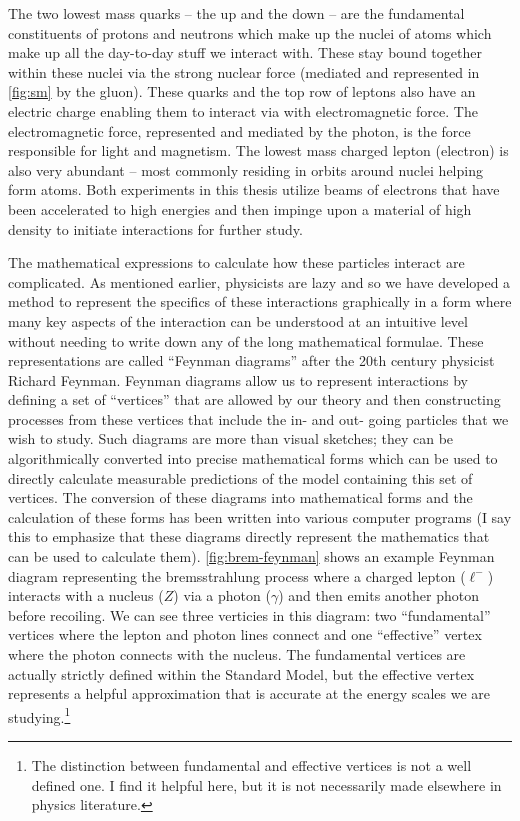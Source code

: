 The two lowest mass quarks -- the up and the down -- are the fundamental constituents of protons
and neutrons which make up the nuclei of atoms which make up all the day-to-day stuff we interact
with. These stay bound together within these nuclei via the strong nuclear force (mediated and
represented in \cref{fig:sm} by the gluon). These quarks and the top row of leptons also have an
electric charge enabling them to interact via with electromagnetic force.
The electromagnetic force, represented and mediated by the photon, is the force
responsible for light and magnetism. The lowest mass charged lepton (electron) is also very
abundant -- most commonly residing in orbits around nuclei helping form atoms. Both experiments in
this thesis utilize beams of electrons that have been accelerated to high energies and then
impinge upon a material of high density to initiate interactions for further study.

The mathematical expressions to calculate how these particles interact are complicated. As
mentioned earlier, physicists are lazy and so we have developed a method to represent the specifics
of these interactions graphically in a form where many key aspects of the interaction can be understood
at an intuitive level without needing to write down any of the long mathematical formulae. These
representations are called ``Feynman diagrams'' after the 20th century physicist Richard Feynman.
Feynman diagrams allow us to represent interactions by defining a set of ``vertices'' that are
allowed by our theory and then constructing processes from these vertices that include the in- and
out- going particles that we wish to study. Such diagrams are more than visual sketches; they can
be algorithmically converted into precise mathematical forms which can be used to directly calculate
measurable predictions of the model containing this set of vertices. The conversion of these diagrams
into mathematical forms and the calculation of these forms has been written into various computer
programs (I say this to emphasize that these diagrams directly represent the mathematics that
can be used to calculate them).
\cref{fig:brem-feynman} shows an example Feynman diagram representing the bremsstrahlung process
where a charged lepton (\(\ell^-\)) interacts with a nucleus (\(Z\)) via a photon (\(\gamma\)) and
then emits another photon before recoiling. We can see three verticies in this diagram: two
``fundamental'' vertices where the lepton and photon lines connect and one ``effective'' vertex
where the photon connects with the nucleus. The fundamental vertices are actually strictly defined
within the Standard Model, but the effective vertex represents a helpful approximation that is
accurate at the energy scales we are studying.\footnote{ The distinction between fundamental and
	effective vertices is not a well defined one. I find it helpful here, but it is not necessarily
	made elsewhere in physics literature. }


